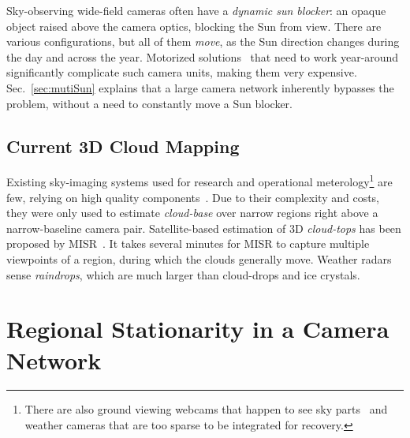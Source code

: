 \documentclass[runningheads]{llncs}
\begin{document}
Sky-observing wide-field cameras often have a {\em dynamic sun blocker}: an opaque object raised above the camera optics, blocking the Sun from view. There are various configurations, but all of them {\em move}, as the Sun direction changes during the day and across the year. Motorized solutions~\cite{Pust2008} that need to work year-around significantly complicate such camera units, making them very expensive. Sec.~\ref{sec:mutiSun} explains that a large camera network inherently bypasses the problem, without a need to constantly move a Sun blocker.




\subsection{Current 3D Cloud Mapping}
\label{sec:current3D}

Existing sky-imaging systems used for research and operational meterology\footnote{There are also ground viewing webcams that happen to see sky parts~\cite{bradley,jacobs14cloudmap} and weather cameras
that are too sparse to be integrated for recovery.} are few, relying on high quality components~\cite{allmen,angeo-27-953-2009,cazorla,long,Seiz,kassianov}. Due to their complexity and costs, they were only used to estimate {\em cloud-base} over narrow regions right above a narrow-baseline camera pair. Satellite-based estimation of 3D {\em cloud-tops} has been proposed by MISR~\cite{Seiz2006}. It takes several minutes for MISR to capture multiple viewpoints of a region, during which the clouds generally move. Weather radars sense {\em raindrops}, which are much larger than cloud-drops and ice crystals.

\section{Regional Stationarity in a Camera Network}
\label{sec:station}
\end{document}
